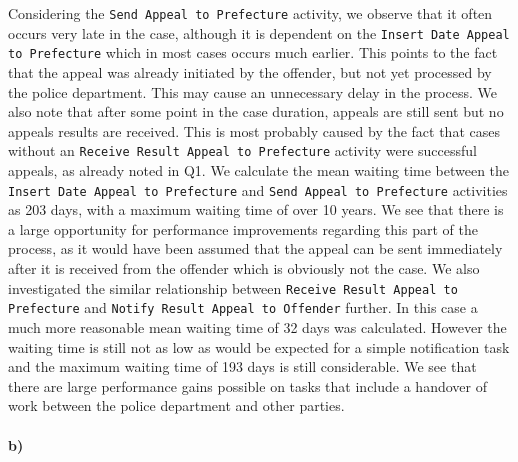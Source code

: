 \documentclass[12pt]{report}
\begin{document}
Considering the \texttt{Send Appeal to Prefecture} activity, we observe that it often occurs very late in the case, although it is dependent on the \texttt{Insert Date Appeal to Prefecture} which in most cases occurs much earlier. This points to the fact that the appeal was already initiated by the offender, but not yet processed by the police department. This may cause an unnecessary delay in the process. We also note that after some point in the case duration, appeals are still sent but no appeals results are received. This is most probably caused by the fact that cases without an \texttt{Receive Result Appeal to Prefecture} activity were successful appeals, as already noted in Q1. We calculate the mean waiting time between the \texttt{Insert Date Appeal to Prefecture} and \texttt{Send Appeal to Prefecture} activities as 203 days, with a maximum waiting time of over 10 years. We see that there is a large opportunity for performance improvements regarding this part of the process, as it would have been assumed that the appeal can be sent immediately after it is received from the offender which is obviously not the case. We also investigated the similar relationship between \texttt{Receive Result Appeal to Prefecture} and \texttt{Notify Result Appeal to Offender} further. In this case a much more reasonable mean waiting time of 32 days was calculated. However the waiting time is still not as low as would be expected for a simple notification task and the maximum waiting time of 193 days is still considerable. We see that there are large performance gains possible on tasks that include a handover of work between the police department and other parties. 

\paragraph{\textbf{b)}}
\end{document}
